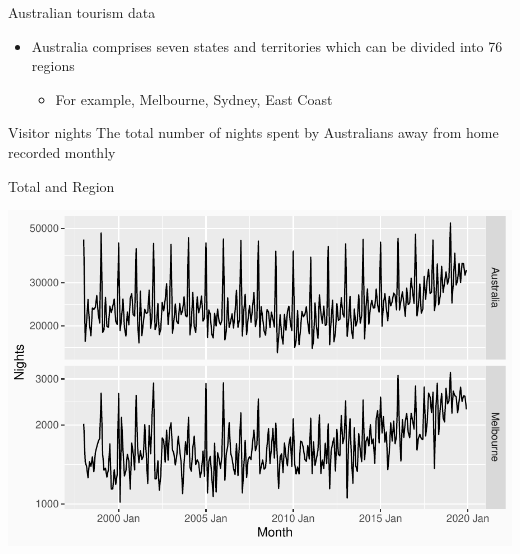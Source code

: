 \documentclass[14pt,ignorenonframetext,]{beamer}
\providecommand{\tightlist}{%
  \setlength{\itemsep}{0pt}\setlength{\parskip}{0pt}}
\begin{document}
\begin{frame}{Australian tourism data}
\protect\hypertarget{australian-tourism-data}{}
\begin{itemize}
\tightlist
\item
  Australia comprises seven states and territories which can be divided
  into 76 regions

  \begin{itemize}
  \tightlist
  \item
    For example, Melbourne, Sydney, East Coast
  \end{itemize}
\end{itemize}

\begin{block}{Visitor nights}
\protect\hypertarget{visitor-nights}{}
The total number of nights spent by Australians away from home recorded
monthly
\end{block}
\end{frame}

\begin{frame}{Total and Region}
\protect\hypertarget{total-and-region}{}
\begin{center}
\includegraphics[width=\linewidth]{plot/p_aus_mel}
\end{center}
\end{frame}
\end{document}
